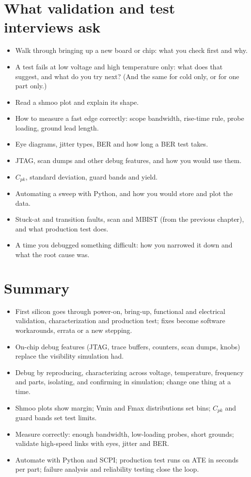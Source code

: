 \section{What validation and test interviews ask}

\begin{itemize}
  \item Walk through bringing up a new board or chip: what you check first and why.
  \item A test fails at low voltage and high temperature only: what does that suggest, and what do you try next? (And the same for cold only, or for one part only.)
  \item Read a shmoo plot and explain its shape.
  \item How to measure a fast edge correctly: scope bandwidth, rise-time rule, probe loading, ground lead length.
  \item Eye diagrams, jitter types, BER and how long a BER test takes.
  \item JTAG, scan dumps and other debug features, and how you would use them.
  \item $C_{pk}$, standard deviation, guard bands and yield.
  \item Automating a sweep with Python, and how you would store and plot the data.
  \item Stuck-at and transition faults, scan and MBIST (from the previous chapter), and what production test does.
  \item A time you debugged something difficult: how you narrowed it down and what the root cause was.
\end{itemize}

\section{Summary}

\begin{itemize}
  \item First silicon goes through power-on, bring-up, functional and electrical validation, characterization and production test; fixes become software workarounds, errata or a new stepping.
  \item On-chip debug features (JTAG, trace buffers, counters, scan dumps, knobs) replace the visibility simulation had.
  \item Debug by reproducing, characterizing across voltage, temperature, frequency and parts, isolating, and confirming in simulation; change one thing at a time.
  \item Shmoo plots show margin; Vmin and Fmax distributions set bins; $C_{pk}$ and guard bands set test limits.
  \item Measure correctly: enough bandwidth, low-loading probes, short grounds; validate high-speed links with eyes, jitter and BER.
  \item Automate with Python and SCPI; production test runs on ATE in seconds per part; failure analysis and reliability testing close the loop.
\end{itemize}
